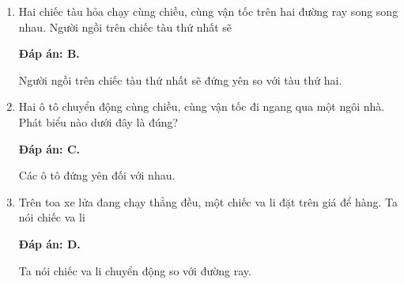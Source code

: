 \begin{enumerate}[label=\bfseries Câu \arabic*:]
{	}
	\item {}
	
	
	{Hai chiếc tàu hỏa chạy cùng chiều, cùng vận tốc trên hai đường ray song song nhau. Người ngồi trên chiếc tàu thứ nhất sẽ
		
	}
	
	\hideall
	{\textbf{Đáp án: B.}
		
		Người ngồi trên chiếc tàu thứ nhất sẽ đứng yên so với tàu thứ hai.
		
	}
	
	\item {}
	
	
	{Hai ô tô chuyển động cùng chiều, cùng vận tốc đi ngang qua một ngôi nhà. Phát biểu nào dưới đây là đúng?
	}
	
	\hideall
	{	\textbf{Đáp án: C.}
		
		Các ô tô đứng yên đối với nhau.
		
	}
	\item {}
	
	
	{Trên toa xe lửa đang chạy thẳng đều, một chiếc va li đặt trên giá để hàng. Ta nói chiếc va li
	}
	
	\hideall
	{\textbf{Đáp án: D.}	
		
		Ta nói chiếc va li chuyển động so với đường ray.
		
}
\end{enumerate}
